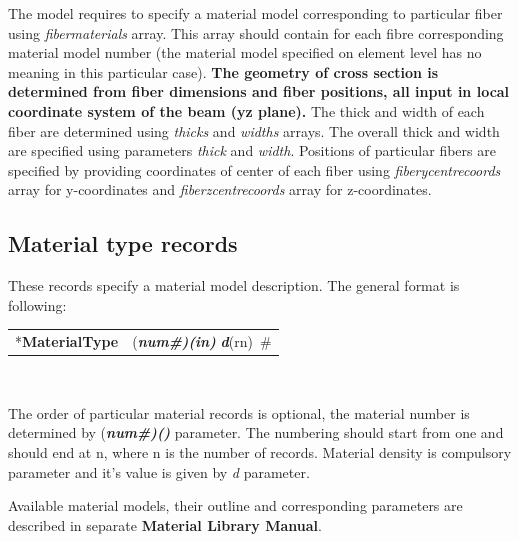 \documentclass[a4paper]{article}
\makeatletter
\newcommand{\param}[1]{{\em #1}}
\newcommand{\fieldVal}[2]{\mbox{({\it\bf{#1}\#)\tiny (#2)}}}
\newcommand{\keywordnotype}[1]{\mbox{{\it{\bf{#1}}}}}
\newcommand{\keyword}[2]{\mbox{{\keywordnotype{#1}\tiny (#2)}}}
\newcommand{\entKeyword}[1]{\mbox{{*{\bf{#1}}}}}
\newcommand{\entKeywordInst}[1]{\mbox{{\bf{{#1}}}}}
\newcommand{\field}[2]{\mbox{\keyword{#1}{#2}~\#}}
\newenvironment{record}[1][]{\begin{tabular}{|ll}}{\end{tabular}\\}
\newcommand{\recentry}[2]{{#1}&{#2}\\}
\newcounter{rcc}
\newenvironment{record}[1][\textwidth]{\setcounter{rcc}{0}\begin{tabular*}{#1}{|ll@{\extracolsep{\fill}}r}}{\end{tabular*}\\}
\newcommand{\recentry}[2]{\ifthenelse{\value{rcc}>0}{&$\backslash$ \\}{\setcounter{rcc}{1}}{#1}&{#2}}
\makeatother
\begin{document}
\begin{itemize}
The model requires to specify a material model corresponding to particular fiber using \param{fibermaterials} array. This array should contain for each fibre corresponding material model number (the material model specified on element level has no meaning in this particular case).
{\bf The geometry of cross section is determined from fiber dimensions and fiber positions, all input in local coordinate system of the beam (yz plane).} The thick and width of each fiber are determined using \param{thicks} and \param{widths} arrays. The overall thick and width are specified using parameters \param{thick} and \param{width}. Positions of particular fibers are specified by providing coordinates of center of each fiber using \param{fiberycentrecoords} array for y-coordinates and \param{fiberzcentrecoords} array for z-coordinates.
\end{itemize}

\subsection{Material type  records}
\label{_MaterialTypeRecords}
These records specify a material model  description. The general format is
following:

\noindent
\begin{record}
  \recentry{\entKeyword{MaterialType}}{\fieldVal{num}{in} \field{d}{rn}}
\end{record}

The order of particular material records is optional, the material number is determined by \fieldVal{num}{} parameter.
The numbering should start from one and should end at n, where n is the number of records.
Material density is compulsory parameter and it's value is given by
\param{d} parameter.

Available material models, their outline and
corresponding parameters are described in separate {\bf Material Library Manual}.
\end{document}
